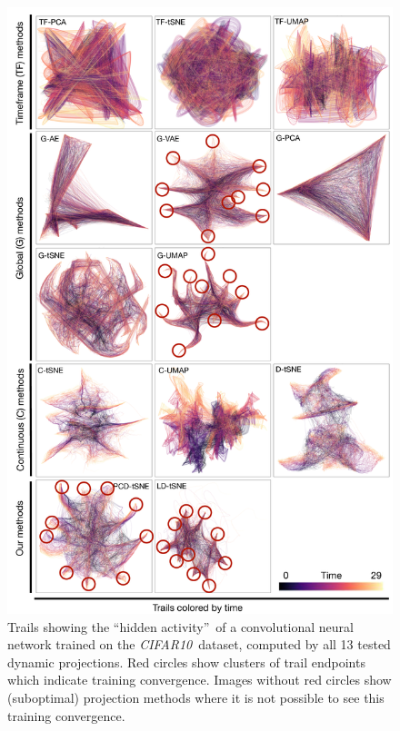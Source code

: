 \begin{figure}[htb!]
  \centering
  \includegraphics[width=\linewidth]{figures/projection-algorithm/cifar-a.png}
  \caption{Trails showing the ``hidden activity''\,\citep{Rauber2017} of a convolutional neural network trained on the \emph{CIFAR10}\,\citep{dataset:cifar10} dataset, computed by all 13 tested dynamic projections. Red circles show clusters of trail endpoints which indicate training convergence. Images without red circles show (suboptimal) projection methods where it is not possible to see this training convergence.}  
  \label{fig:cifar}
\end{figure}

